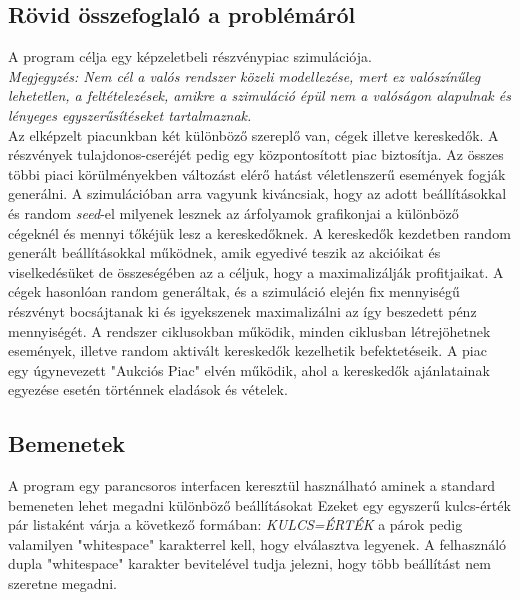 \documentclass[./terv.tex]{subfiles}
\begin{document}
    \subsection{Rövid összefoglaló a problémáról}\label{sec:description}
    A program célja egy képzeletbeli részvénypiac szimulációja. \\
    \textit{Megjegyzés: Nem cél a valós rendszer közeli modellezése, mert ez valószínűleg lehetetlen, a feltételezések, amikre a szimuláció épül nem a valóságon alapulnak és lényeges egyszerűsítéseket tartalmaznak.}\\
    Az elképzelt piacunkban két különböző szereplő van, cégek illetve kereskedők.
    A részvények tulajdonos-cseréjét pedig egy központosított piac biztosítja.
    Az összes többi piaci körülményekben változást elérő hatást véletlenszerű események fogják generálni.
    A szimulációban arra vagyunk kiváncsiak, hogy az adott beállításokkal és random \textit{seed}-el milyenek lesznek az árfolyamok grafikonjai a különböző cégeknél és mennyi tőkéjük lesz a kereskedőknek.
    A kereskedők kezdetben random generált beállításokkal működnek, amik egyedivé teszik az akcióikat és viselkedésüket de összeségében az a céljuk, hogy a maximalizálják profitjaikat.
    A cégek hasonlóan random generáltak, és a szimuláció elején fix mennyiségű részvényt bocsájtanak ki és igyekszenek maximalizálni az így beszedett pénz mennyiségét.
    A rendszer ciklusokban működik, minden ciklusban létrejöhetnek események, illetve random aktivált kereskedők kezelhetik befektetéseik.
    A piac egy úgynevezett "Aukciós Piac" elvén működik, ahol a kereskedők ajánlatainak egyezése esetén történnek eladások és vételek.


    \subsection{Bemenetek}
    A program egy parancsoros interfacen keresztül használható aminek a standard bemeneten lehet megadni különböző beállításokat
    Ezeket egy egyszerű kulcs-érték pár listaként várja a következő formában:
    \textit{KULCS=ÉRTÉK} a párok pedig valamilyen "whitespace" karakterrel kell, hogy elválasztva legyenek.
    A felhasználó dupla "whitespace" karakter bevitelével tudja jelezni, hogy több beállítást nem szeretne megadni.
\end{document}
